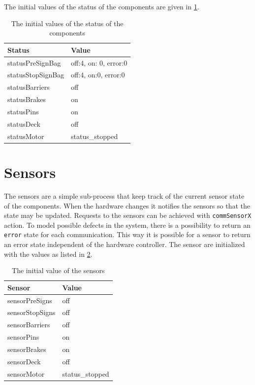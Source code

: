 		The initial values of the status of the components are given in \cref{tbl:statusinit}.
		
		\begin{table}[!htbp]
			\begin{center}
			\begin{tabular}{l l}
				\hline
				Status				& Value	\\
				\hline
				statusPreSignBag	&	{off:4, on: 0, error:0}		\\
				statusStopSignBag	&	{off:4, on:0, error:0}		\\
				statusBarriers		&	off		\\
				statusBrakes		&	on		\\
				statusPins			&	on		\\
				statusDeck			&	off		\\
				statusMotor			&	status\_stopped	\\
				\hline
			\end{tabular}
			\caption{The initial values of the status of the components}
			\label{tbl:statusinit}
			\end{center}
		\end{table}

	\section{Sensors} \label{sec:sensors}
		The sensors are a simple sub-process that keep track of the current sensor state of the components.
		When the hardware changes it notifies the sensors so that the state may be updated.
		Requests to the sensors can be achieved with \texttt{commSensorX} action. 
		To model possible defects in the system, there is a possibility to return an \texttt{error} state for each communication.
		This way it is possible for a sensor to return an error state independent of the hardware controller.
		The sensor are initialized with the values as listed in \cref{tbl:sensorinit}.
		
		\begin{table}[!htbp]
			\begin{center}
			\begin{tabular}{l l}
				\hline
				Sensor	& Value	\\
				\hline
				sensorPreSigns	&	off	\\
				sensorStopSigns	&	off	\\
				sensorBarriers	&	off	\\
				sensorPins		&	on	\\
				sensorBrakes	&	on	\\
				sensorDeck		&	off	\\
				sensorMotor		&	status\_stopped\\
				\hline
			\end{tabular}
			\caption{The initial value of the sensors}
			\label{tbl:sensorinit}
			\end{center}
		\end{table}
	

